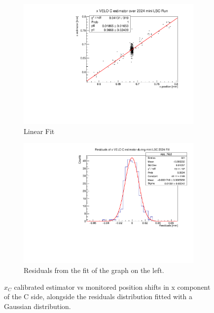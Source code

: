 \begin{figure}
    \centering
    \begin{subfigure}{0.48\textwidth}
    \includegraphics[width=\linewidth]{figures/xVeloC_fit_comparison.pdf}
    \caption{Linear Fit}\label{fig:xCfit_comparison}
    \end{subfigure}
    \begin{subfigure}{0.48\textwidth}
    \includegraphics[width=\linewidth]{figures/xVeloC_res_comparison.pdf}
    \caption{Residuals from the fit of the graph on the left. }\label{fig:xCres_comparison}
    \end{subfigure}
    \caption{$\hat{x}_{C}$ calibrated estimator vs monitored position shifts in x component of the C side, alongside the residuals distribution fitted with a Gaussian distribution.}
    \label{fig:xC_comaprison}
\end{figure}
